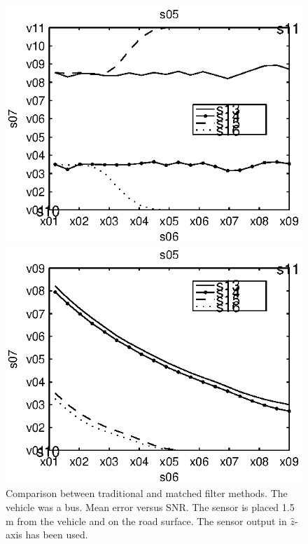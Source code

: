 \begin{subfigures}
\begin{figure}[!tbh]
  \centering
  \begin{minipage}{0.45\linewidth}
  \centering
  
   \includegraphics[width=\linewidth]{images/mean_error_z_bus}
  \caption[Time difference, method comparison. Mean error. $\hat{z}$-axis. (Bus)]{Comparison between traditional and matched filter methods. The vehicle was a bus. Mean error versus SNR. The sensor is placed 1.5 m from the vehicle and on the road surface. The sensor output in $\hat{z}$-axis has been used.}
  \label{fig:comp_mean_z_bus}
  \end{minipage}\hfill
  \begin{minipage}{0.45\linewidth}
   \centering
   
   \includegraphics[width=\linewidth]{images/std_error_z_bus}

\end{minipage}
\end{figure}
\end{subfigures}
